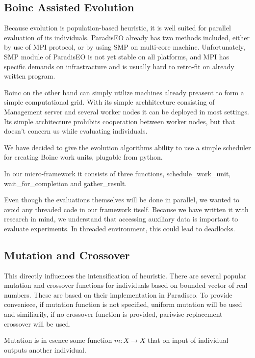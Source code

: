 \documentclass[12pt,oneside]{fithesis2}
\begin{document}
\subsection{Boinc Assisted Evolution}

Because evolution is population-based heuristic, it is well suited for parallel evaluation of its individuals. ParadisEO already has two methods included, either by use of MPI protocol, or by using SMP on multi-core machine\cite{liefooghe2007Paradiseo}. Unfortunately, SMP module of ParadisEO is not yet stable on all platforms, and MPI has specific demands on infrastracture and is usually hard to retro-fit on already written program. 

Boinc on the other hand  can simply utilize machines already preasent to form a simple computational grid. With its simple archhitecture consisting of Management server and several worker nodes it can be deployed in most settings. Its simple architecture prohibits cooperation between worker nodes, but that doesn't concern us while evaluating individuals.

We have decided to give the evolution algorithms ability to use a simple scheduler for creating Boinc work units, plugable from python.

In our micro-framework it consists of three functions, schedule\_work\_unit, wait\_for\_completion and gather\_result.

Even though the evaluations themselves will be done in parallel, we wanted to avoid any threaded code in our framework itself. Because we have written it with research in mind, we understand that accessing auxiliary data is important to evaluate experiments. In threaded environment, this could lead to deadlocks.

\subsection{Mutation and Crossover}
This directly influences the intensification of heuristic. There are several popular mutation and crossover functions for individuals based on bounded vector of real numbers. These are based on their implementation in Paradiseo. To provide conveniece, if mutation function is not specified, uniform mutation will be used and similiarily, if no crossover function is provided, pariwise-replacement crossover will be used. 

Mutation is in esence some function $m:X \to X$ that on input of individual outputs another individual.
\end{document}
